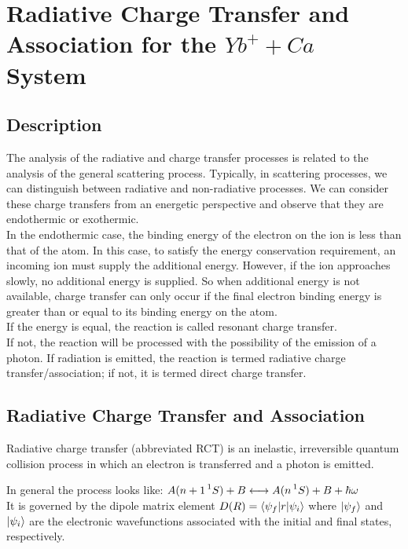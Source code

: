 \chapter{Radiative Charge Transfer and Association for the $ Yb^{+} + Ca $ System}
\label{chap:RRP}
\section{Description}
The analysis of the radiative and charge transfer processes is related to the analysis of the general scattering process.
Typically, in scattering processes, we can distinguish between radiative and non-radiative processes.
We can consider these charge transfers from an energetic perspective and observe that they are endothermic or exothermic.\\
In the endothermic case, the binding energy of the electron on the ion is less than that of the atom. In this case, to satisfy the energy conservation requirement, an incoming ion must supply the additional energy. However, if the ion approaches slowly, no additional energy is supplied. So when additional energy is not available, charge transfer can only occur if the final electron binding energy is greater than or equal to its binding energy on the atom.\\
If the energy is equal, the reaction is called resonant charge transfer.\\
If not, the reaction will be processed with the possibility of the emission of a photon.
If radiation is emitted, the reaction is termed radiative charge transfer/association; if not, it is termed direct charge transfer.
\section{Radiative Charge Transfer and Association}

Radiative charge transfer (abbreviated RCT) is an inelastic, irreversible quantum collision process in which an electron is transferred and a photon is emitted.

In general the process looks like: 
$ A(n+1\prescript{1}{}S) + B \longleftrightarrow A(n\prescript{1}{}S) + B + \hbar\omega $ \\

It is governed by the dipole matrix element $ D(R) = \left\langle \psi_f\middle|r\middle|\psi_i\right\rangle $ where $ \ket{\psi_f} $ and $ \ket{\psi_i} $ are the electronic wavefunctions associated with the initial and final states, respectively. 

